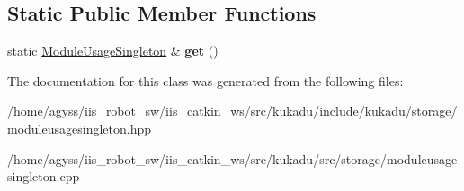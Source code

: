 \subsection*{Static Public Member Functions}
\begin{DoxyCompactItemize}
\item 
static \hyperlink{classkukadu_1_1ModuleUsageSingleton}{Module\+Usage\+Singleton} \& {\bfseries get} ()\hypertarget{classkukadu_1_1ModuleUsageSingleton_ad1a2579d069c91b1bf0e5be22e6c67e4}{}\label{classkukadu_1_1ModuleUsageSingleton_ad1a2579d069c91b1bf0e5be22e6c67e4}

\end{DoxyCompactItemize}


The documentation for this class was generated from the following files\+:\begin{DoxyCompactItemize}
\item 
/home/agyss/iis\+\_\+robot\+\_\+sw/iis\+\_\+catkin\+\_\+ws/src/kukadu/include/kukadu/storage/moduleusagesingleton.\+hpp\item 
/home/agyss/iis\+\_\+robot\+\_\+sw/iis\+\_\+catkin\+\_\+ws/src/kukadu/src/storage/moduleusagesingleton.\+cpp\end{DoxyCompactItemize}
